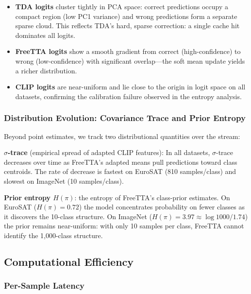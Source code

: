 \documentclass[12pt,a4paper]{article}
\newcommand{\1}{\mathbf{1}}
\begin{document}
\begin{itemize}
  \item \textbf{TDA logits} cluster tightly in PCA space: correct predictions occupy a compact
  region (low PC1 variance) and wrong predictions form a separate sparse cloud.
  This reflects TDA's hard, sparse correction: a single cache hit dominates all logits.

  \item \textbf{FreeTTA logits} show a smooth gradient from correct (high-confidence) to wrong
  (low-confidence) with significant overlap---the soft mean update yields a richer distribution.

  \item \textbf{CLIP logits} are near-uniform and lie close to the origin in logit space on
  all datasets, confirming the calibration failure observed in the entropy analysis.
\end{itemize}

\subsubsection{Distribution Evolution: Covariance Trace and Prior Entropy}

Beyond point estimates, we track two distributional quantities over the stream:

\textbf{$\sigma$-trace} (empirical spread of adapted CLIP features):
In all datasets, $\sigma$-trace decreases over time as FreeTTA's adapted means pull predictions
toward class centroids.
The rate of decrease is fastest on EuroSAT (810 samples/class) and slowest on ImageNet (10 samples/class).

\textbf{Prior entropy $H(\pi)$}: the entropy of FreeTTA's class-prior estimates.
On EuroSAT ($H(\pi)=0.72$) the model concentrates probability on fewer classes as it
discovers the 10-class structure.
On ImageNet ($H(\pi)=3.97 \approx \log 1000 / 1.74$) the prior remains near-uniform:
with only 10 samples per class, FreeTTA cannot identify the 1,000-class structure.

\subsection{Computational Efficiency}

\subsubsection{Per-Sample Latency}
\end{document}
